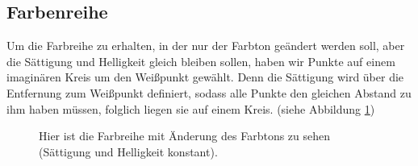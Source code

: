 \documentclass[11pt]{article}
\begin{document}


\subsection{Farbenreihe}
Um die Farbreihe zu erhalten, in der nur der Farbton geändert werden soll, aber die Sättigung und Helligkeit gleich bleiben sollen, haben wir Punkte auf einem imaginären Kreis um den Weißpunkt gewählt. Denn die Sättigung wird über die Entfernung zum Weißpunkt definiert, sodass alle Punkte den gleichen Abstand zu ihm haben müssen, folglich liegen sie auf einem Kreis. (siehe Abbildung \ref{farbton_reihe})
\begin{figure}[H]
\caption{Hier ist die Farbreihe mit Änderung des Farbtons zu sehen (Sättigung und Helligkeit konstant).}
\label{farbton_reihe}
\end{figure}
\end{document}
